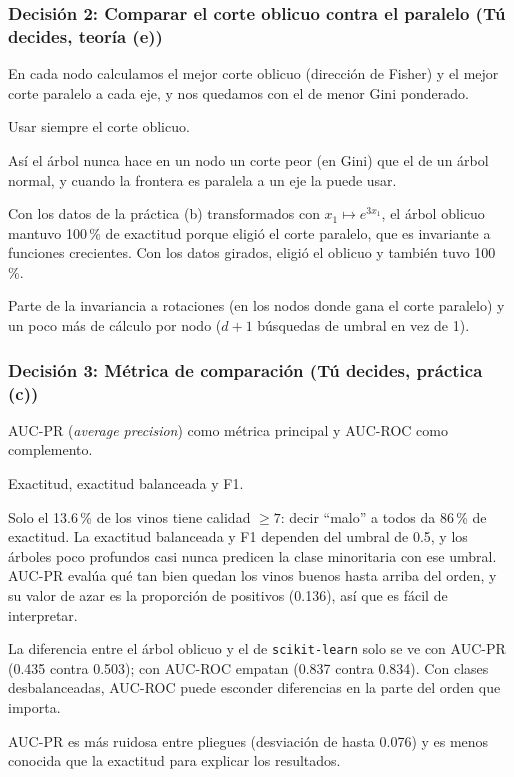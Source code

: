 \documentclass[11pt, letterpaper]{article}
\begin{document}
\subsubsection*{Decisión 2: Comparar el corte oblicuo contra el paralelo (Tú decides, teoría (e))}
\begin{description}[leftmargin=0pt, itemsep=2pt]
    \item[Decisión.] En cada nodo calculamos el mejor corte oblicuo (dirección de Fisher) y el mejor corte paralelo a cada eje, y nos quedamos con el de menor Gini ponderado.
    \item[Alternativa descartada.] Usar siempre el corte oblicuo.
    \item[Por qué.] Así el árbol nunca hace en un nodo un corte peor (en Gini) que el de un árbol normal, y cuando la frontera es paralela a un eje la puede usar.
    \item[Evidencia.] Con los datos de la práctica (b) transformados con $x_1 \mapsto e^{3x_1}$, el árbol oblicuo mantuvo 100\,\% de exactitud porque eligió el corte paralelo, que es invariante a funciones crecientes. Con los datos girados, eligió el oblicuo y también tuvo 100\,\%.
    \item[Qué perdemos.] Parte de la invariancia a rotaciones (en los nodos donde gana el corte paralelo) y un poco más de cálculo por nodo ($d + 1$ búsquedas de umbral en vez de 1).
\end{description}

\subsubsection*{Decisión 3: Métrica de comparación (Tú decides, práctica (c))}
\begin{description}[leftmargin=0pt, itemsep=2pt]
    \item[Decisión.] AUC-PR (\emph{average precision}) como métrica principal y AUC-ROC como complemento.
    \item[Alternativas descartadas.] Exactitud, exactitud balanceada y F1.
    \item[Por qué.] Solo el 13.6\,\% de los vinos tiene calidad $\ge 7$: decir ``malo'' a todos da 86\,\% de exactitud. La exactitud balanceada y F1 dependen del umbral de 0.5, y los árboles poco profundos casi nunca predicen la clase minoritaria con ese umbral. AUC-PR evalúa qué tan bien quedan los vinos buenos hasta arriba del orden, y su valor de azar es la proporción de positivos (0.136), así que es fácil de interpretar.
    \item[Evidencia.] La diferencia entre el árbol oblicuo y el de \texttt{scikit-learn} solo se ve con AUC-PR (0.435 contra 0.503); con AUC-ROC empatan (0.837 contra 0.834). Con clases desbalanceadas, AUC-ROC puede esconder diferencias en la parte del orden que importa.
    \item[Qué perdemos.] AUC-PR es más ruidosa entre pliegues (desviación de hasta 0.076) y es menos conocida que la exactitud para explicar los resultados.
\end{description}
\end{document}
